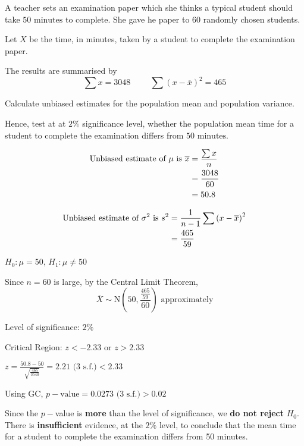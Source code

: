 \documentclass[11pt,a4paper]{book}
\begin{document}
\begin{example}

A teacher sets an examination paper which she thinks a typical student
should take $50\text{ minutes}$ to complete. She gave he paper to
$60$ randomly chosen students.

Let $X$ be the time, in minutes, taken by a student to complete the
examination paper.

The results are summarised by
\[
\sum x=3048\hspace{1cm}\sum\left(x-\overline{x}\right)^{2}=465
\]

Calculate unbiased estimates for the population mean and population
variance.

Hence, test at at $2\%$ significance level, whether the population
mean time for a student to complete the examination differs from $50\text{ minutes}$.

\Solution

\begin{align*}
\text{Unbiased estimate of \ensuremath{\mu} is }\overline{x} & =\frac{\sum x}{n}\\
 & =\frac{3048}{60}\\
 & =50.8
\end{align*}

\begin{align*}
\text{Unbiased estimate of \ensuremath{\sigma^{2}} is }s^{2} & =\frac{1}{n-1}\sum\left(x-\overline{x}\right)^{2}\\
 & =\frac{465}{59}
\end{align*}

$H_{0}:\mu=50$, $H_{1}:\mu\neq50$

Since $n=60$ is large, by the Central Limit Theorem,
\[
\overline{X}\sim\text{N}\left(50,\frac{\frac{465}{59}}{60}\right)\text{ approximately}
\]

Level of significance: $2\%$

Critical Region: $z<-2.33$ or $z>2.33$

${\displaystyle z=\frac{50.8-50}{\sqrt{\frac{465}{3540}}}}=2.21\text{ (3 s.f.)}<2.33$

Using GC, $p-\text{value}=0.0273\text{ (3 s.f.)}>0.02$

\begin{tcolorbox}[colback=white, colframe=black,boxrule=.4pt, sharpish corners]

Since the $p-$value is \textbf{more} than the level of significance,
we \textbf{do not reject} $H_{0}$. There is \textbf{insufficient}
evidence, at the $2\%$ level, to conclude that the mean time for
a student to complete the examination differs from 50 minutes.
\end{tcolorbox}

\end{example}
\end{document}
